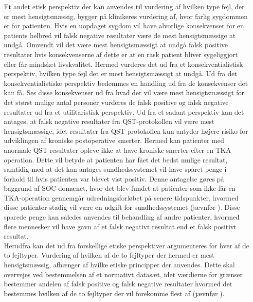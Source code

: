 Et andet etisk perspektiv der kan anvendes til vurdering af hvilken type fejl, der er mest hensigtsmæssig, bygger på klinikeres vurdering af, hvor farlig sygdommen er for patienten. Hvis en uopdaget sygdom vil have alvorlige konsekvenser for en patients helbred vil falsk negative resultater være de mest hensigtsmæssige at undgå. Omvendt vil det være mest hensigtsmæssigt at undgå falsk positive resultater hvis konsekvenserne af dette er at en rask patient bliver sygeliggjort eller får mindsket livskvalitet. \citep{Kraemer2011} Hermed vurderes det ud fra et konsekventialistisk perspektiv, hvilken type fejl det er mest hensigtsmæssigt at undgå. Ud fra det konsekventialistiske perspektiv bedømmes en handling ud fra de konsekvenser det kan få. Ses disse konsekvenser ud fra hvad der vil være mest hensigtsmæssigt for det størst mulige antal personer vurderes de falsk positive og falsk negative resultater ud fra et utilitaristisk perspektiv. \citep{Kraemer2011} Ud fra et sådant perspektiv kan det antages, at falsk negative resultater fra QST-protokollen vil være mest hensigtsmæssige, idet resultater fra QST-protokollen kun antyder højere risiko for udviklingen af kroniske postoperative smerter. Hermed kan patienter med anormale QST-resultater opleve ikke at have kroniske smerter efter en TKA-operation. Dette vil betyde at patienten har fået det bedst mulige resultat, samtidig med at det kan antages sundhedssystemet vil have sparet penge i forhold til hvis patienten var blevet vist positiv. Denne antagelse gøres på baggrund af SOC-domænet, hvor det blev fundet at patienter som ikke får en TKA-operation gennemgår udredningsforløbet på senere tidspunkter, hvormed disse patienter stadig vil være en udgift for sundhedssystemet (jævnfør ). Disse sparede penge kan således anvendes til behandling af andre patienter, hvormed flere mennesker vil have gavn af et falsk negativt resultat end et falsk positivt resultat. \\
Herudfra kan det ud fra forskellige etiske perspektiver argumenteres for hver af de to fejltyper. Vurdering af hvilken af de to fejltyper der hermed er mest hensigtsmæssig, afhænger af hvilke etiske principper der anvendes. Dette skal overvejes ved bestemmelsen af et normativt datasæt, idet værdierne for grænser bestemmer andelen af falsk positive og falsk negative resultater hvormed det bestemmes hvilken af de to fejltyper der vil forekomme flest af (jævnfør ).  


